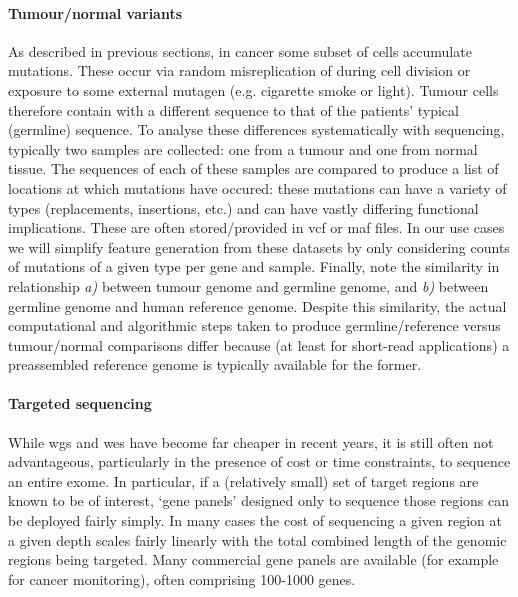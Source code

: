 \documentclass[thesis.tex]{subfiles}
\begin{document}
\paragraph{Tumour/normal variants}
As described in previous sections, in cancer some subset of cells accumulate mutations. These occur via random misreplication of  during cell division or exposure to some external mutagen (e.g. cigarette smoke or  light). Tumour cells therefore contain  with a different sequence to that of the patients' typical (germline) sequence. To analyse these differences systematically with sequencing, typically two samples are collected: one from a tumour and one from normal tissue. The sequences of each of these samples are compared to produce a list of locations at which mutations have occured: these mutations can have a variety of types (replacements, insertions, etc.) and can have vastly differing functional implications. These are often stored/provided in \gls{vcf} or \gls{maf} files. In our use cases we will simplify feature generation from these datasets by only considering counts of mutations of a given type per gene and sample. Finally, note the similarity in relationship \emph{a)} between tumour genome and germline genome, and \emph{b)} between germline genome and human reference genome. Despite this similarity, the actual computational and algorithmic steps taken to produce germline/reference versus tumour/normal comparisons differ because (at least for short-read applications) a preassembled reference genome is typically available for the former.

\paragraph{Targeted sequencing}
While \gls{wgs} and \gls{wes} have become far cheaper in recent years, it is still often not advantageous, particularly in the presence of cost or time constraints, to sequence an entire exome. In particular, if a (relatively small) set of target regions are known to be of interest, `gene panels' designed only to sequence those regions can be deployed fairly simply. In many cases the cost of sequencing a given region at a given depth scales fairly linearly with the total combined length of the genomic regions being targeted. Many commercial gene panels are available (for example for cancer monitoring), often comprising 100-1000 genes.
\end{document}
